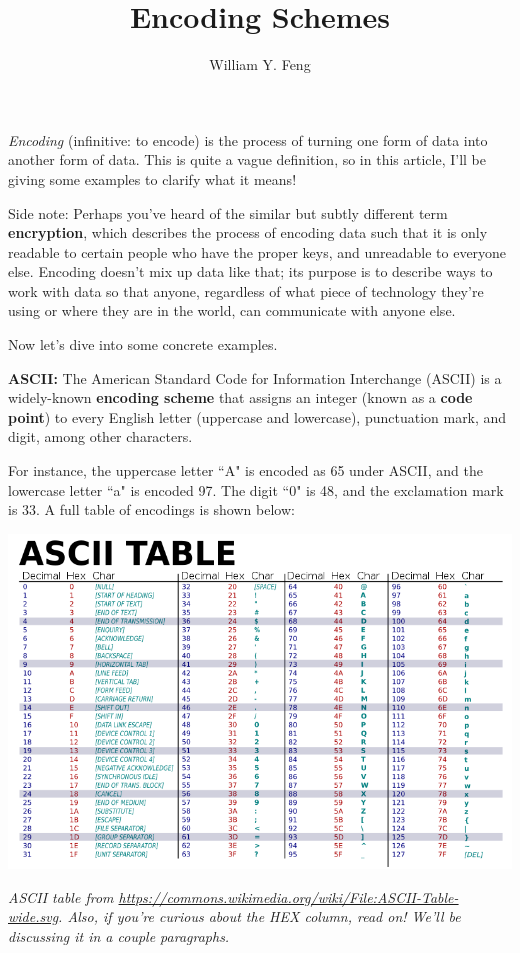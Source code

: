 \documentclass{article}
\title{Encoding Schemes}
\author{William Y. Feng}
\begin{document}
\maketitle
\textit{Encoding} (infinitive: to encode) is the process of turning one form of data into another form of data. This is quite a vague definition, so in this article, I'll be giving some examples to clarify what it means!

Side note: Perhaps you've heard of the similar but subtly different term \textbf{encryption}, which describes the process of encoding data such that it is only readable to certain people who have the proper keys, and unreadable to everyone else. Encoding doesn't mix up data like that; its purpose is to describe ways to work with data so that anyone, regardless of what piece of technology they're using or where they are in the world, can communicate with anyone else.

Now let's dive into some concrete examples.

\textbf{ASCII:}
The American Standard Code for Information Interchange (ASCII) is a widely-known \textbf{encoding scheme} that assigns an integer (known as a \textbf{code point}) to every English letter (uppercase and lowercase), punctuation mark, and digit, among other characters.

For instance, the uppercase letter ``A" is encoded as 65 under ASCII, and the lowercase letter ``a" is encoded 97. The digit ``0" is 48, and the exclamation mark is 33. A full table of encodings is shown below:

\begin{center}
    \footnotesize
    \includegraphics[]{images/ascii_table.png}
    
    \textit{ASCII table from \url{https://commons.wikimedia.org/wiki/File:ASCII-Table-wide.svg}. Also, if you're curious about the HEX column, read on! We'll be discussing it in a couple paragraphs.}
\end{center}
\end{document}
